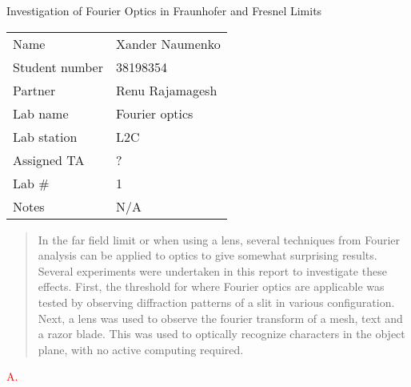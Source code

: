 \documentclass[letterpaper, reqno,11pt]{article}
\begin{document}
\begin{titlepage}
\centering


\Large Investigation of Fourier Optics in Fraunhofer and Fresnel Limits

\normalsize




\begin{tabular}{ll}
Name & Xander Naumenko \\[2ex]
Student number & 38198354 \\[2ex]
Partner & Renu Rajamagesh \\[2ex]
Lab name & Fourier optics \\[2ex]
Lab station  & L2C \\[2ex]
Assigned TA            & ? \\[2ex]
Lab \#            & 1 \\[2ex]
Notes &  N/A
\end{tabular}



\end{titlepage}

\begin{abstract}
    In the far field limit or when using a lens, several techniques from Fourier analysis can be applied to optics to give somewhat surprising results. Several experiments were undertaken in this report to investigate these effects. First, the threshold for where Fourier optics are applicable was tested by observing diffraction patterns of a slit in various configuration. Next, a lens was used to observe the fourier transform of a mesh, text and a razor blade. This was used to optically recognize characters in the object plane, with no active computing required.
\end{abstract}



\textcolor{red}{A.}
 
\end{document}
